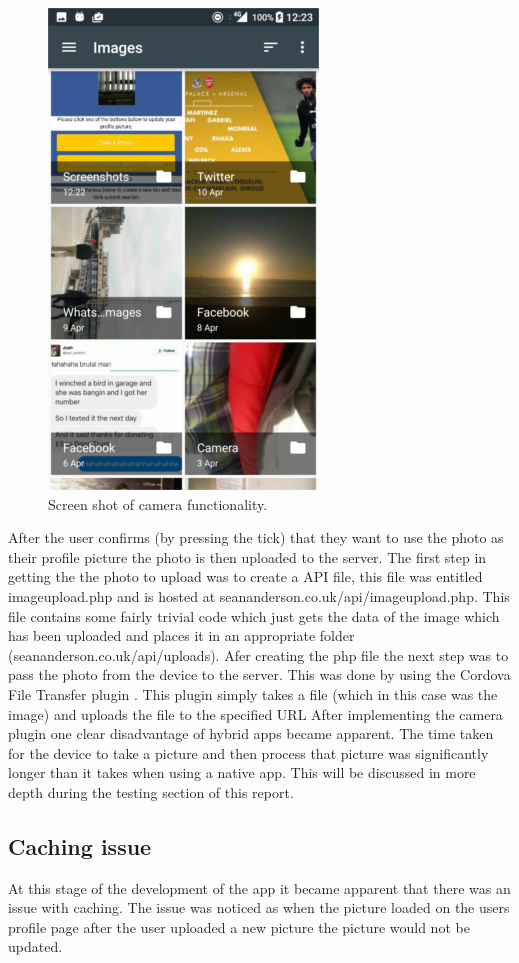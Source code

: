 \begin{center}
\begin{figure}[H]
\includegraphics[scale=0.5]{images/sc9}
\caption{Screen shot of camera functionality.}
\end{figure}
\end{center}

After the user confirms (by pressing the tick) that they want to use the photo as their profile picture the photo is then uploaded to the server. The first step in getting the  the photo to upload was to create a API file, this file was entitled imageupload.php and is hosted at seananderson.co.uk/api/imageupload.php. This file contains some fairly trivial code which just gets the data of the image which has been uploaded and places it in an appropriate folder (seananderson.co.uk/api/uploads). Afer creating the php file the next step was to pass the photo from the device to the server. This was done by using the Cordova File Transfer plugin \cite{ft}. This plugin simply takes a file (which in this case was the image) and uploads the file to the specified URL
After implementing the camera plugin one clear disadvantage of hybrid apps became apparent. The time taken for the device to take a picture and then process that picture was significantly longer than it takes when using a native app. This will be discussed in more depth during the testing section of this report. 

\subsection{Caching issue}
At this stage of the development of the app it became apparent that there was an issue with caching. The issue was noticed as when the picture loaded on the users profile page after the user uploaded a new picture the picture would not be updated. 

